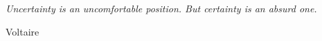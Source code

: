 \chapter*{}
\renewcommand{\epigraphsize}{\large}
\setlength{\epigraphwidth}{0.8\textwidth}
\renewcommand{\epigraphflush}{center}
\renewcommand{\epigraphrule}{0pt}
\epigraph{\textit{Uncertainty is an uncomfortable position. But certainty is an absurd one.}}{Voltaire}
